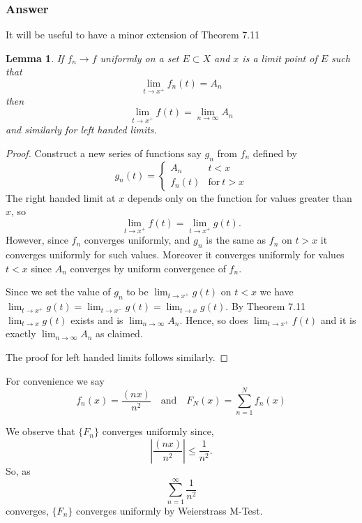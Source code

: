\documentclass[12pt]{article}
\newtheorem{lemma}[theorem]{Lemma}
\begin{document}
\subsubsection{Answer}
It will be useful to have a minor extension of Theorem 7.11
\begin{lemma} \label{magic} If $f_n \to f$ uniformly on a set $E \subset X$ and $x$ is a limit point of $E$ such that 
\[\lim_{t \to x^+} f_n(t) = A_n\]
then 
\[ \lim_{t \to x^+} f(t) = \lim_{n\to \infty}A_n  \]
and similarly for left handed limits.
 \end{lemma}

\begin{proof}
Construct a new series of functions say $g_n$ from $f_n$ defined by 
\[
g_n(t) = \left\{
\begin{array}{lr}
A_n& t<x\\
f_n(t)& \mathrm{for\ } t>x
\end{array}
\right.
\]
The right handed limit at $x$ depends only on the function for values greater than $x$, so
\[ \lim_{t \to x^+} f(t) = \lim_{t \to x^+} g(t)  . \]
However, since $f_n$ converges uniformly, and $g_n$ is the same as $f_n$ on $t>x$ it converges uniformly for such values. Moreover it converges uniformly for values $t<x$ since $A_n$ converges by uniform convergence of $f_n$.

Since we set the value of $g_n$ to be $\lim_{t \to x^+} g(t)$ on $t<x$ we have $\lim_{t \to x^+} g(t) = \lim_{t \to x^-} g(t) = \lim_{t \to x} g(t)$. By Theorem 7.11 $\lim_{t \to x} g(t)$ exists and is $\lim_{n \to \infty} A_n$. Hence, so does $\lim_{t \to x^+} f(t)$ and it is exactly $\lim_{n \to \infty}  A_n$ as claimed.



The proof for left handed limits follows similarly.
\end{proof}

For convenience we say
\[f_n(x)=\frac{(nx)}{n^2} \quad \mathrm{and} \quad F_N(x)=\sum_{n=1}^N f_n(x)\]

We observe that $\{F_n\}$ converges uniformly since, 
\[ \left| \frac{(n x)}{n^2} \right| \leq \frac{1}{n^2}.\]
So, as
\[\sum_{n=1}^\infty \frac{1}{n^2}\]
converges, $\{F_n\}$ converges uniformly by Weierstrass M-Test.
\end{document}
